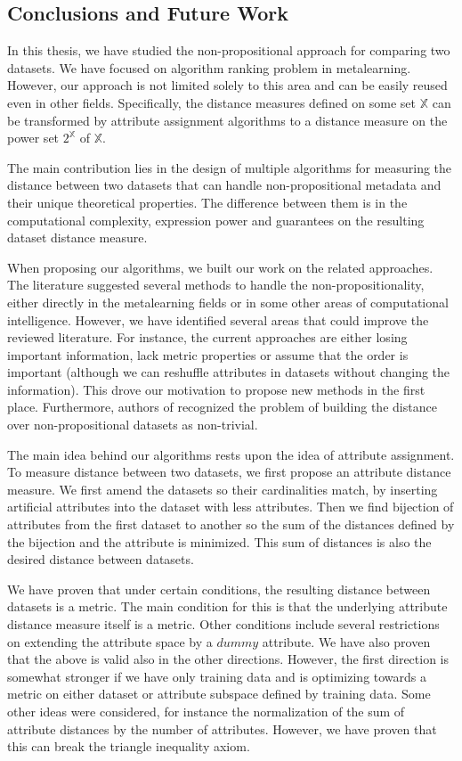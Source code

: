 \documentclass{article}
\newcommand{\dummy}{dummy}
\begin{document}
\begin{refsegment}
\section{Conclusions and Future Work}
In this thesis, we have studied the non-propositional approach for comparing two datasets. We have focused on algorithm ranking problem in metalearning. However, our approach is not limited solely to this area and can be easily reused even in other fields. Specifically, the distance measures defined on some set $\mathbb{X}$ can be transformed by attribute assignment algorithms
to a distance measure on the power set $2^\mathbb{X}$ of $\mathbb{X}.$

The main contribution lies in the design of multiple algorithms for measuring the distance between two datasets that can handle non-propositional metadata and their unique theoretical properties. The difference between them is in the computational complexity, expression power and guarantees on the resulting dataset distance measure.

When proposing our algorithms, we built our work on the related approaches. The literature suggested several methods to handle the non-propositionality, either directly in the metalearning fields or in some other areas of computational intelligence. However, we have identified several areas that could improve the reviewed literature. For instance, the current approaches are either losing important information, lack metric properties or assume that the order is important (although we can reshuffle attributes in datasets without changing the information). This drove our motivation to propose new methods in the first place. Furthermore, authors of \cite{RepresentationalIssuesInMetalearning} recognized the problem of building the distance over non-propositional datasets as non-trivial.

The main idea behind our algorithms rests upon the idea of attribute assignment. To measure distance between two datasets, we first propose an attribute distance measure. We first amend the datasets so their cardinalities match, by inserting artificial attributes into the dataset with less attributes. Then we find bijection of attributes from the first dataset to another so the sum of the distances defined by the bijection and the attribute is minimized. This sum of distances is also the desired distance between datasets.

We have proven that under certain conditions, the resulting distance between datasets is a metric. The main condition for this is that the underlying attribute distance measure itself is a metric. Other conditions include several restrictions on extending the attribute space by a $\dummy$ attribute. We have also proven that the above is valid also in the other directions.
However, the first direction is somewhat stronger if we have only training data and is optimizing towards a metric on either dataset or attribute subspace defined by training data.
Some other ideas were considered, for instance the normalization of the sum of attribute distances by the number of attributes. However, we have proven that this can break the triangle inequality axiom.


\end{refsegment}
\end{document}
